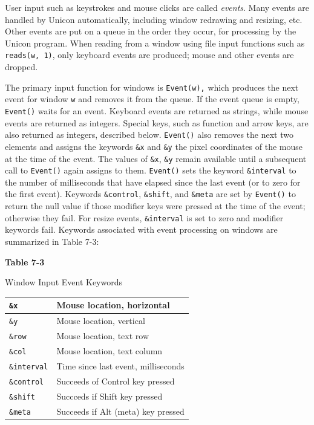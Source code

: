User input such as keystrokes and mouse clicks are called
\textit{events}. Many events are handled by Unicon automatically,
including window redrawing and resizing, etc.
Other events are put on a queue in the order they occur, for
processing by the Unicon program. When reading from a window using file
input functions such as \texttt{reads(w, 1)}, only keyboard events are
produced; mouse and other events are dropped.

The primary input function for windows is \texttt{Event(w),} which
produces the next event for window \texttt{w} and removes it from the
queue. If the event queue is empty, \texttt{Event()} waits for an
event. Keyboard events are returned as strings, while mouse events are
returned as integers. Special keys, such as function and arrow keys,
are also returned as integers, described below. \texttt{Event()} also
removes the next two elements and assigns the keywords \texttt{\&x} and
\texttt{\&y} the pixel coordinates of the mouse at the time of the
event. The values of \texttt{\&x}, \texttt{\&y} remain available until
a subsequent call to \texttt{Event()} again assigns to them.
\texttt{Event()} sets the keyword \texttt{\&interval} to the number of
milliseconds that have elapsed since the last event (or to zero for the
first event). Keywords \texttt{\&control}, \texttt{\&shift}, and
\texttt{\&meta} are set by \texttt{Event()} to return the null value if
those modifier keys were pressed at the time of the event; otherwise
they fail. For resize events, \texttt{\&interval} is set to zero and
modifier keywords fail. Keywords associated with event processing on
windows are summarized in Table 7-3:

{\centering\sffamily\bfseries
Table 7-3

Window Input Event Keywords
}

\begin{center}
\begin{supertabular}{|m{0.91775984in}|m{2.3525598in}|}
\texttt{\&x} &
Mouse location, horizontal\\\hline
\texttt{\&y} &
Mouse location, vertical\\\hline
\texttt{\&row} &
Mouse location, text row\\\hline
\texttt{\&col} &
Mouse location, text column\\\hline
\texttt{\&interval} &
Time since last event, milliseconds\\\hline
\texttt{\&control} &
Succeeds of Control key pressed\\\hline
\texttt{\&shift} &
Succceds if Shift key pressed\\\hline
\texttt{\&meta} &
Succeeds if Alt (meta) key pressed\\\hline
\end{supertabular}
\end{center}
